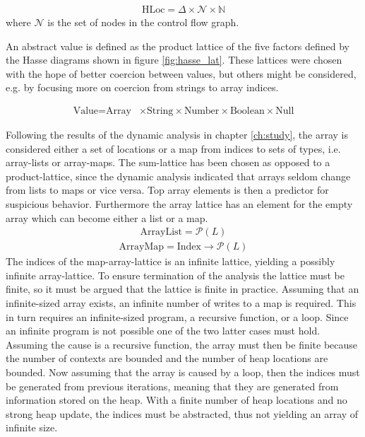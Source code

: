 \begin{align}
\text{HLoc}  = \Delta \times \mathcal{N} \times \mathbb{N}
\end{align}
where $\mathcal{N}$ is the set of nodes in the control flow graph. 

An abstract value is defined as the product lattice of the five factors defined by the Hasse diagrams shown in figure \ref{fig:hasse_lat}. These lattices were chosen with the hope of better coercion between values, but others might be considered, e.g. by focusing more on coercion from strings to array indices.

\begin{align}
\text{Value} = \text{Array} & \times \text{String} \times \text{Number} \times \text{Boolean}  \times \text{Null}
\end{align}

Following the results of the dynamic analysis in chapter \ref{ch:study}, the array is considered either a set of locations or a map from indices to sets of types, i.e. array-lists or array-maps. The sum-lattice has been chosen as opposed to a product-lattice, since the dynamic analysis indicated that arrays seldom change from lists to maps or vice versa. Top array elements is then a predictor for suspicious behavior. Furthermore the array lattice has an element for the empty array which can become either a list or a map.  
\begin{align}
\text{ArrayList}= \mathcal{P}( L )
\end{align}
\begin{align}
\text{ArrayMap}=\text{Index} \rightarrow \mathcal{P}( L )
\end{align}
The indices of the map-array-lattice is an infinite lattice, yielding a possibly infinite array-lattice. To ensure termination of the analysis the lattice must be finite, so it must be argued that the lattice is finite in practice. Assuming that an infinite-sized array exists, an infinite number of writes to a map is required. This in turn requires an infinite-sized program, a recursive function, or a loop. Since an infinite program is not possible one of the two latter cases must hold. Assuming the cause is a recursive function, the array must then be finite because the number of contexts are bounded and the number of heap locations are bounded. Now assuming that the array is caused by a loop, then the indices must be generated from previous iterations, meaning that they are generated from information stored on the heap. With a finite number of heap locations and no strong heap update, the indices must be abstracted, thus not yielding an array of infinite size.

